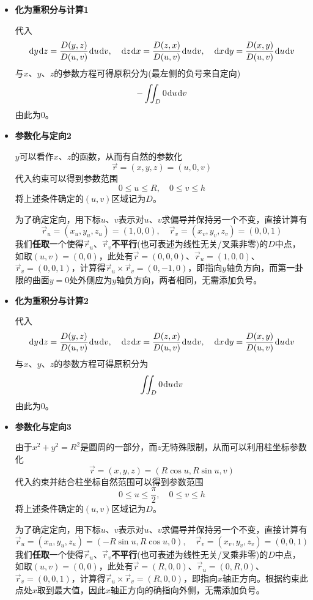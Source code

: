 \documentclass[a4paper,UTF8,fontset=windows,AutoFakeBold]{ctexart}
\newcommand*{\dr}{\hspace{0.07em}\mathrm{d}}
\newcommand*{\rv}{\vec{r}}
\newcommand*{\note}{\noindent *}
\theoremstyle{ex}
\begin{document}
\begin{enumerate}
{\begin{itemize}
            \note 只要曲面边界处$\rv_u$、$\rv_v$存在，用边界点判断定向可以得到正确的结果，详见本讲义21.3.2。
            
            \item \textbf{化为重积分与计算1}
            
            代入
            $$\dr y\dr z=\frac{D(y,z)}{D(u,v)}\dr u\dr v,\quad\dr z\dr x=\frac{D(z,x)}{D(u,v)}\dr u\dr v,\quad\dr x\dr y=\frac{D(x,y)}{D(u,v)}\dr u\dr v$$
            与$x$、$y$、$z$的参数方程可得原积分为(最左侧的负号来自定向)
            $$-\iint_D0\dr u\dr v$$
            由此为0。
            
            \item \textbf{参数化与定向2}
            
            $y$可以看作$x$、$z$的函数，从而有自然的参数化
            $$\vec{r}=(x,y,z)=(u,0,v)$$
            代入约束可以得到参数范围
            $$0\le u\le R,\quad 0\le v\le h$$
            将上述条件确定的$(u,v)$区域记为$D$。

            为了确定定向，用下标$u$、$v$表示对$u$、$v$求偏导并保持另一个不变，直接计算有
            $$\rv_u=(x_u,y_u,z_u)=(1,0,0),\quad\rv_v=(x_v,y_v,z_v)=(0,0,1)$$
            我们\textbf{任取}一个使得$\rv_u$、$\rv_v$\textbf{不平行}(也可表述为线性无关/叉乘非零)的$D$中点，如取$(u,v)=(0,0)$，此处有$\rv=(0,0,0)$、$\rv_u=(1,0,0)$、$\rv_v=(0,0,1)$，计算得$\rv_u\times\rv_v=(0,-1,0)$，即指向$y$轴负方向，而第一卦限的曲面$y=0$处外侧应为$y$轴负方向，两者相同，无需添加负号。

            \item \textbf{化为重积分与计算2}
            
            代入
            $$\dr y\dr z=\frac{D(y,z)}{D(u,v)}\dr u\dr v,\quad\dr z\dr x=\frac{D(z,x)}{D(u,v)}\dr u\dr v,\quad\dr x\dr y=\frac{D(x,y)}{D(u,v)}\dr u\dr v$$
            与$x$、$y$、$z$的参数方程可得原积分为
            $$\iint_D0\dr u\dr v$$
            由此为0。
            
            \item \textbf{参数化与定向3}
            
            由于$x^2+y^2=R^2$是圆周的一部分，而$z$无特殊限制，从而可以利用柱坐标参数化
            $$\vec{r}=(x,y,z)=(R\cos u,R\sin u,v)$$
            代入约束并结合柱坐标自然范围可以得到参数范围
            $$0\le u\le\frac{\pi}{2},\quad 0\le v\le h$$
            将上述条件确定的$(u,v)$区域记为$D$。

            为了确定定向，用下标$u$、$v$表示对$u$、$v$求偏导并保持另一个不变，直接计算有
            $$\rv_u=(x_u,y_u,z_u)=(-R\sin u,R\cos u,0),\quad\rv_v=(x_v,y_v,z_v)=(0,0,1)$$
            我们\textbf{任取}一个使得$\rv_u$、$\rv_v$\textbf{不平行}(也可表述为线性无关/叉乘非零)的$D$中点，如取$(u,v)=(0,0)$，此处有$\rv=(R,0,0)$、$\rv_u=(0,R,0)$、$\rv_v=(0,0,1)$，计算得$\rv_u\times\rv_v=(R,0,0)$，即指向$x$轴正方向。根据约束此点处$x$取到最大值，因此$x$轴正方向的确指向外侧，无需添加负号。


\end{itemize}}
\end{enumerate}
\end{document}
